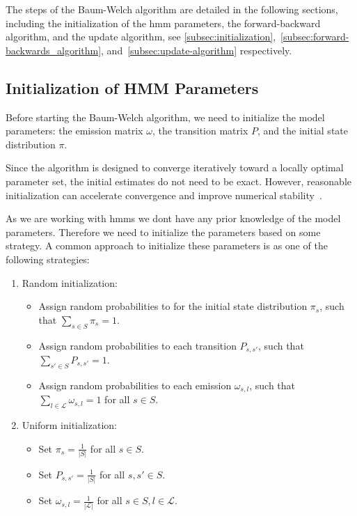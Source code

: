 The steps of the Baum-Welch algorithm are detailed in the following sections, including the initialization of the \gls{hmm} parameters, the forward-backward algorithm, and the update algorithm, see \autoref{subsec:initialization},~\ref{subsec:forward-backwards_algorithm}, and~\ref{subsec:update-algorithm} respectively.

\subsection{Initialization of HMM Parameters}\label{subsec:initialization}
Before starting the Baum-Welch algorithm, we need to initialize the model parameters: the emission matrix $\omega$, the transition matrix $P$, and the initial state distribution $\pi$.

Since the algorithm is designed to converge iteratively toward a locally optimal parameter set, the initial estimates do not need to be exact.
However, reasonable initialization can accelerate convergence and improve numerical stability~\cite{benyacoub2015initial}.

As we are working with \glspl{hmm} we dont have any prior knowledge of the model parameters.
Therefore we need to initialize the parameters based on some strategy. 
A common approach to initialize these parameters is as one of the following strategies:

\begin{enumerate}
    \item Random initialization: 
    \begin{itemize}
        \item Assign random probabilities to for the initial state distribution $\pi_s$, such that $\sum_{s \in S} \pi_s = 1$.
        \item Assign random probabilities to each transition $P_{s, s'}$, such that $\sum_{s' \in S} P_{s, s'} = 1$.
        \item Assign random probabilities to each emission $\omega_{s, l}$, such that $\sum_{l \in \mathcal{L}} \omega_{s, l} = 1$ for all $s \in S$.
    \end{itemize}
    \item Uniform initialization: 
    \begin{itemize}
        \item Set $\pi_s = \frac{1}{|S|}$ for all $s \in S$.
        \item Set $P_{s, s'} = \frac{1}{|S|}$ for all $s, s' \in S$.
        \item Set $\omega_{s, l} = \frac{1}{|\mathcal{L}|}$ for all $s \in S, l \in \mathcal{L}$.
    \end{itemize}
\end{enumerate}

